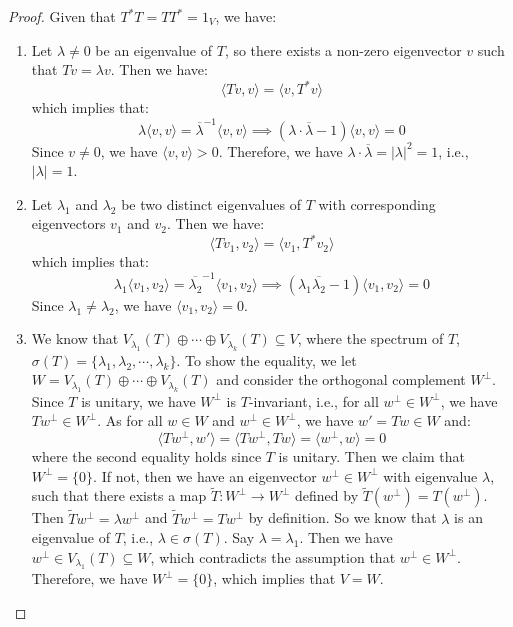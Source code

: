 \begin{proof}
	Given that $T^* T = T T^* = 1_V$, we have:
	\begin{enumerate}[label = (\arabic*)]
		\item Let $\lambda \neq 0$ be an eigenvalue of $T$, so there exists a non-zero eigenvector $v$ such that $Tv = \lambda v$. Then we have:
		      \[
			      \langle Tv, v \rangle = \langle v, T^* v \rangle
		      \]
		      which implies that:
		      \[
			      \lambda \langle v, v \rangle = \overline{\lambda}^{-1} \langle v, v \rangle \implies (\lambda \cdot \overline{\lambda} - 1) \langle v, v \rangle = 0
		      \]
		      Since $v \neq 0$, we have $\langle v, v \rangle > 0$. Therefore, we have $\lambda \cdot \overline{\lambda} = |\lambda|^2 = 1$, i.e., $|\lambda| = 1$.

		\item Let $\lambda_1$ and $\lambda_2$ be two distinct eigenvalues of $T$ with corresponding eigenvectors $v_1$ and $v_2$. Then we have:
		      \[
			      \langle Tv_1, v_2 \rangle = \langle v_1, T^* v_2 \rangle
		      \]
		      which implies that:
		      \[
			      \lambda_1 \langle v_1, v_2 \rangle = \overline{\lambda_2}^{-1} \langle v_1, v_2 \rangle \implies (\lambda_1 \overline{\lambda_2} - 1) \langle v_1, v_2 \rangle = 0
		      \]
		      Since $\lambda_1 \neq \lambda_2$, we have $\langle v_1, v_2 \rangle = 0$.

		\item We know that $V_{\lambda_1} (T) \oplus \cdots \oplus V_{\lambda_k} (T) \subseteq V$, where the spectrum of $T$, $\sigma(T) = \{ \lambda_1, \lambda_2, \cdots, \lambda_k \}$. To show the equality, we let $W = V_{\lambda_1} (T) \oplus \cdots \oplus V_{\lambda_k} (T)$ and consider the orthogonal complement $W^\perp$. Since $T$ is unitary, we have $W^\perp$ is $T$-invariant, i.e., for all $w^\perp \in W^\perp$, we have $T w^\perp \in W^\perp$. As for all $w \in W$ and $w^\perp \in W^\perp$, we have $w' = T w \in W$ and:
		      \[
			      \langle T w^\perp, w' \rangle = \langle T w^\perp, T w \rangle = \langle w^\perp, w \rangle = 0
		      \]
		      where the second equality holds since $T$ is unitary. Then we claim that $W^\perp = \{ 0 \}$. If not, then we have an eigenvector $w^\perp \in W^\perp$ with eigenvalue $\lambda$, such that there exists a map $\widetilde{T} : W^\perp \to W^\perp$ defined by $\widetilde{T}(w^\perp) = T(w^\perp)$. Then $\widetilde{T} w^\perp = \lambda w^\perp$ and $\widetilde{T} w^\perp = T w^\perp$ by definition. So we know that $\lambda$ is an eigenvalue of $T$, i.e., $\lambda \in \sigma(T)$. Say $\lambda = \lambda_1$. Then we have $w^\perp \in V_{\lambda_1} (T) \subseteq W$, which contradicts the assumption that $w^\perp \in W^\perp$. Therefore, we have $W^\perp = \{ 0 \}$, which implies that $V = W$. \qedhere
	\end{enumerate}
\end{proof}

